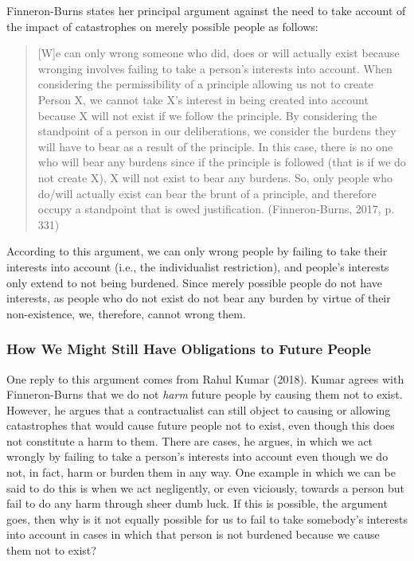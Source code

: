 \documentclass[man,11pt,a4paper]{apa7}
\begin{document}
Finneron-Burns states her principal argument against the need to take account of the impact of catastrophes on merely possible people as follows:

\begin{quote}
[W]e can only wrong someone who did, does or will actually exist because wronging involves failing to take a person's interests into account. When considering the permissibility of a principle allowing us not to create Person X, we cannot take X's interest in being created into account because X will not exist if we follow the principle. By considering the standpoint of a person in our deliberations, we consider the burdens they will have to bear as a result of the principle. In this case, there is no one who will bear any burdens since if the principle is followed (that is if we do not create X), X will not exist to bear any burdens. So, only people who do/will actually exist can bear the brunt of a principle, and therefore occupy a standpoint that is owed justification. (Finneron-Burns, 2017, p. 331)
\end{quote}

According to this argument, we can only wrong people by failing to take their interests into account (i.e., the individualist restriction), and people's interests only extend to not being burdened. Since merely possible people do not have interests, as people who do not exist do not bear any burden by virtue of their non-existence, we, therefore, cannot wrong them.

\subsubsection{How We Might Still Have Obligations to Future People}

One reply to this argument comes from Rahul Kumar (2018). Kumar agrees with Finneron-Burns that we do not \textit{harm} future people by causing them not to exist. However, he argues that a contractualist can still object to causing or allowing catastrophes that would cause future people not to exist, even though this does not constitute a harm to them. There are cases, he argues, in which we act wrongly by failing to take a person's interests into account even though we do not, in fact, harm or burden them in any way. One example in which we can be said to do this is when we act negligently, or even viciously, towards a person but fail to do any harm through sheer dumb luck. If this is possible, the argument goes, then why is it not equally possible for us to fail to take somebody's interests into account in cases in which that person is not burdened because we cause them not to exist?
\end{document}
